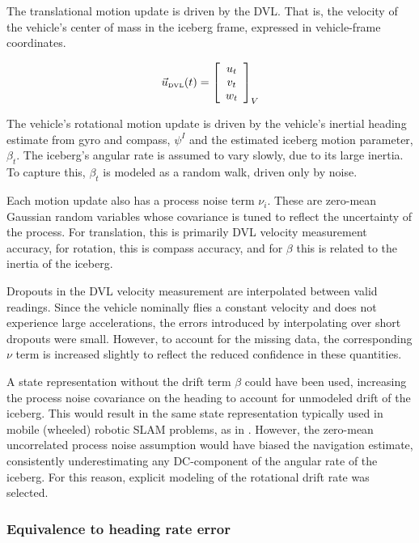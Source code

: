 The translational motion update is driven by the DVL. That is, the velocity of the vehicle's center of mass in the iceberg frame, expressed in vehicle-frame coordinates. 

\begin{equation}
\vec{u}_\text{\tiny{DVL}}(t) = 
                    \left[\begin{array}{c}
                     u_t \\ v_t \\ w_t 
                     \end{array}\right]_V
\end{equation}

The vehicle's rotational motion update is driven by the vehicle's inertial heading estimate from gyro and compass, $\psi^I$ and the estimated iceberg motion parameter, $\beta_t$.  The iceberg's angular rate is assumed to vary slowly, due to its large inertia. To capture this, $\beta_t$ is modeled as a random walk, driven only by noise.

Each motion update also has a process noise term $\nu_i$. These are zero-mean Gaussian random variables whose covariance is tuned to reflect the uncertainty of the process. For translation, this is primarily DVL velocity measurement accuracy, for rotation, this is compass accuracy, and for $\beta$ this is related to the inertia of the iceberg. 

Dropouts in the DVL velocity measurement are interpolated between valid readings. Since the vehicle nominally flies a constant velocity and does not experience large accelerations, the errors introduced by interpolating over short dropouts were small. However, to account for the missing data, the corresponding $\nu$ term is increased slightly to reflect the reduced confidence in these quantities.

A state representation without the drift term $\beta$ could have been used, increasing the process noise covariance on the heading to account for unmodeled drift of the iceberg. This would result in the same state representation typically used in mobile (wheeled) robotic SLAM problems, as in \cite{Thrun2005}. However, the zero-mean uncorrelated process noise assumption would have biased the navigation estimate, consistently underestimating any DC-component of the angular rate of the iceberg. For this reason, explicit modeling of the rotational drift rate was selected.

\subsubsection{Equivalence to heading rate error}

